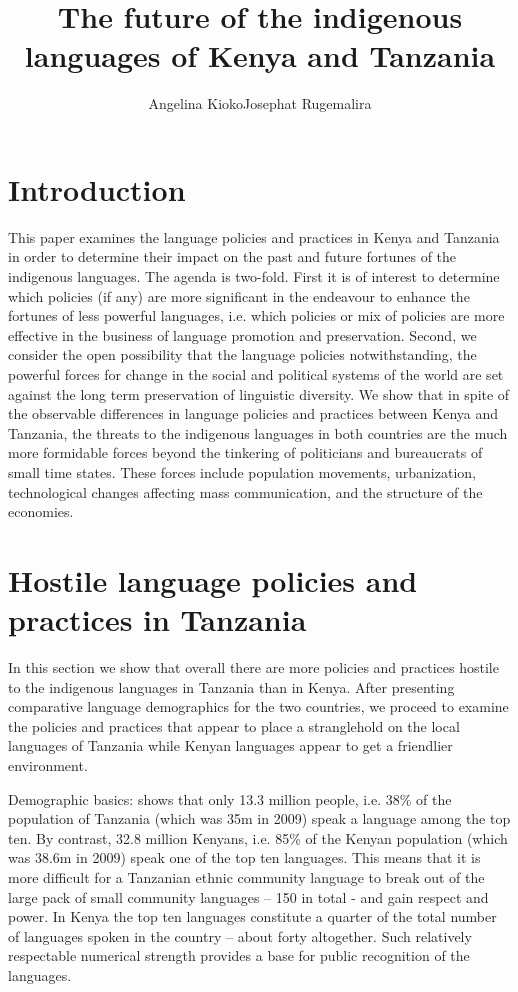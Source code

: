 \documentclass[output=paper,colorlinks,citecolor=brown]{langscibook}
\author{Angelina Kioko\affiliation{US International University-Africa}\lastand Josephat Rugemalira \affiliation{Tumaini University College Dar es Salaam}}
\title
{The future of the indigenous languages of Kenya and Tanzania}
\begin{document}
\maketitle

\section{Introduction}\label{sec:kioko:1}

This paper examines the language policies and practices in Kenya and Tanzania in order to determine their impact on the past and future fortunes of the indigenous languages. The agenda is two-fold. First it is of interest to determine which policies (if any) are more significant in the endeavour to enhance the fortunes of less powerful languages, i.e. which policies or mix of policies are more effective in the business of language promotion and preservation. Second, we consider the open possibility that the language policies notwithstanding, the powerful forces for change in the social and political systems of the world are set against the long term preservation of linguistic diversity. We show that in spite of the observable differences in language policies and practices between Kenya and Tanzania, the threats to the indigenous languages in both countries are the much more formidable forces beyond the tinkering of politicians and bureaucrats of small time states. These forces include population movements, urbanization, technological changes affecting mass communication, and the structure of the economies.

\section{Hostile language policies and practices in Tanzania}\label{sec:kioko:2}

In this section we show that overall there are more policies and practices hostile to the indigenous languages in Tanzania than in Kenya. After presenting comparative language demographics for the two countries, we proceed to examine the policies and practices that appear to place a stranglehold on the local languages of Tanzania while Kenyan languages appear to get a friendlier environment.

Demographic basics:  shows that only 13.3 million people, i.e. 38\% of the population of Tanzania (which was 35m in 2009) speak a language among the top ten. By contrast, 32.8 million Kenyans, i.e.  85\% of the Kenyan population (which was 38.6m in 2009) speak one of the top ten languages. This means that it is more difficult for a Tanzanian ethnic community language to break out of the large pack of small community languages – 150 in total - and gain respect and power. In Kenya the top ten languages constitute a quarter of the total number of languages spoken in the country – about forty altogether. Such relatively respectable numerical strength provides a base for public recognition of the languages.
\end{document}
